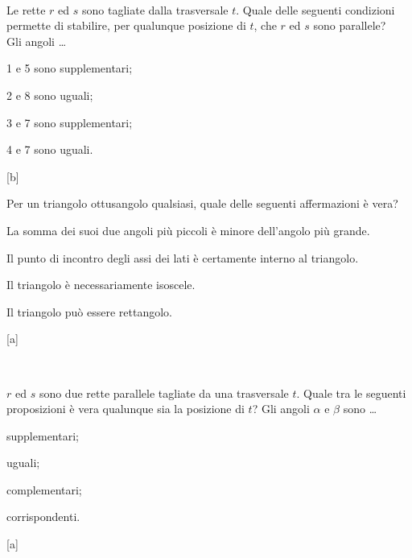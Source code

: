 \begin{esercizio}
\label{ese:3.112}
~\\
\noindent\begin{minipage}{0.6\textwidth}
Le rette $r$ ed $s$ sono tagliate dalla trasversale $t$. Quale delle 
seguenti condizioni permette di stabilire, per qualunque posizione di 
$t$, che $r$ ed $s$ sono parallele?\\
Gli angoli \ldots{}
\begin{enumeratea}
\item 1 e 5 sono supplementari;
\item 2 e 8 sono uguali;
\item 3 e 7 sono supplementari;
\item 4 e 7 sono uguali.
\end{enumeratea}
\end{minipage}\hfil
\begin{minipage}{0.4\textwidth}
\centering
\end{minipage}
\hfill [b]
\end{esercizio}

\begin{esercizio}
\label{ese:3.113}
Per un triangolo ottusangolo qualsiasi, quale delle seguenti 
affermazioni è vera?
\begin{enumeratea}
\item La somma dei suoi due angoli più piccoli è minore dell'angolo 
più grande.
\item Il punto di incontro degli assi dei lati è certamente interno 
al triangolo.
\item Il triangolo è necessariamente isoscele.
\item Il triangolo può essere rettangolo.
\end{enumeratea}
\vspace{-5mm}
\hfill [a]
\end{esercizio}

\begin{esercizio}
\label{ese:3.114}
~\\
\noindent\begin{minipage}{0.65\textwidth}
$r$ ed $s$ sono due rette parallele tagliate da una trasversale $t$. 
Quale tra le seguenti proposizioni è vera qualunque sia la posizione 
di $t$?
Gli angoli $\alpha$ e $\beta$ sono \ldots{}
\begin{multicols}{2}
\begin{enumeratea}
\item supplementari;
\item uguali;
\item complementari;
\item corrispondenti.
\end{enumeratea}
\end{multicols}
\end{minipage}\hfil
\begin{minipage}{0.35\textwidth}
\centering
\end{minipage}
\hfill [a]
\end{esercizio}

